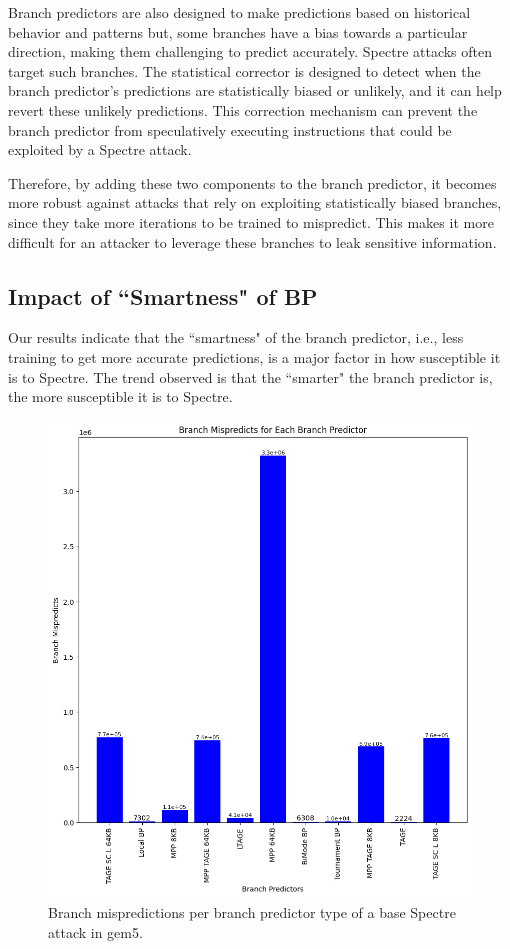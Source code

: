 \documentclass[twocolumn,showpacs,%
  nofootinbib,aps,superscriptaddress,%
  eqsecnum,prd,notitlepage,showkeys,10pt]{revtex4-1}
\begin{document}
Branch predictors are also designed to make predictions based on historical behavior and patterns but, some branches have a bias towards a particular direction, making them challenging to predict accurately. Spectre attacks often target such branches. The statistical corrector is designed to detect when the branch predictor's predictions are statistically biased or unlikely, and it can help revert these unlikely predictions. This correction mechanism can prevent the branch predictor from speculatively executing instructions that could be exploited by a Spectre attack.

Therefore, by adding these two components to the branch predictor, it becomes more robust against attacks that rely on exploiting statistically biased branches, since they take more iterations to be trained to mispredict. This makes it more difficult for an attacker to leverage these branches to leak sensitive information.

\subsection{Impact of ``Smartness" of BP}

Our results indicate that the ``smartness" of the branch predictor, i.e., less training to get more accurate predictions, is a major factor in how susceptible it is to Spectre. The trend observed is that the ``smarter" the branch predictor is, the more susceptible it is to Spectre.

\begin{figure}
    \centering
    \includegraphics[width=\linewidth]{Branch Mispredicts.png}
    \caption{Branch mispredictions per branch predictor type of a base Spectre attack in gem5.}
\end{figure}
\end{document}
